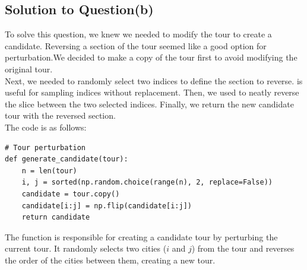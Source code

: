 \documentclass[a4paper]{article}
\begin{document}
\subsection{Solution to Question(b)}
To solve this question, we knew we needed to modify the tour to create a candidate. Reversing a section of the tour seemed like a good option for perturbation.We decided to make a copy of the tour first to avoid modifying the original tour.\\
Next, we needed to randomly select two indices to define the section to reverse.  is useful for sampling indices without replacement. Then, we used  to neatly reverse the slice between the two selected indices. Finally, we return the new candidate tour with the reversed section.\\
The code is as follows:
\begin{verbatim}
# Tour perturbation
def generate_candidate(tour):
    n = len(tour)
    i, j = sorted(np.random.choice(range(n), 2, replace=False))
    candidate = tour.copy()
    candidate[i:j] = np.flip(candidate[i:j])
    return candidate
\end{verbatim}
The  function is responsible for creating a candidate tour by perturbing the current tour. It randomly selects two cities ($i$ and $j$) from the tour and reverses the order of the cities between them, creating a new tour. 
\end{document}

